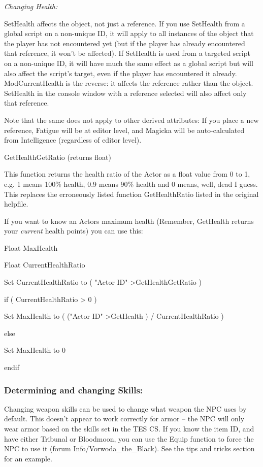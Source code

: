 \emph{Changing Health:}

SetHealth affects the object, not just a reference. If you use SetHealth
from a global script on a non-unique ID, it will apply to all instances
of the object that the player has not encountered yet (but if the player
has already encountered that reference, it won't be affected). If
SetHealth is used from a targeted script on a non-unique ID, it will
have much the same effect as a global script but will also affect the
script's target, even if the player has encountered it already.
ModCurrentHealth is the reverse: it affects the reference rather than
the object. SetHealth in the console window with a reference selected
will also affect only that reference.

Note that the same does not apply to other derived attributes: If you
place a new reference, Fatigue will be at editor level, and Magicka will
be auto-calculated from Intelligence (regardless of editor level).

GetHealthGetRatio (returns float)

This function returns the health ratio of the Actor as a float value
from 0 to 1, e.g. 1 means 100\% health, 0.9 means 90\% health and 0
means, well, dead I guess. This replaces the erroneously listed function
GetHealthRatio listed in the original helpfile.

If you want to know an Actors maximum health (Remember, GetHealth
returns your \emph{current} health points) you can use this:

Float MaxHealth

Float CurrentHealthRatio

Set CurrentHealthRatio to ( "Actor ID"-\textgreater GetHealthGetRatio )

if ( CurrentHealthRatio \textgreater{} 0 )

Set MaxHealth to ( ("Actor ID"-\textgreater GetHealth ) /
CurrentHealthRatio )

else

Set MaxHealth to 0

endif

\hypertarget{determining-and-changing-skills}{%
\subsubsection{Determining and changing
Skills:}\label{determining-and-changing-skills}}

Changing weapon skills can be used to change what weapon the NPC uses by
default. This doesn't appear to work correctly for armor -- the NPC will
only wear armor based on the skills set in the TES CS. If you know the
item ID, and have either Tribunal or Bloodmoon, you can use the Equip
function to force the NPC to use it (forum Info/Vorwoda\_the\_Black).
See the tips and tricks section for an example.

